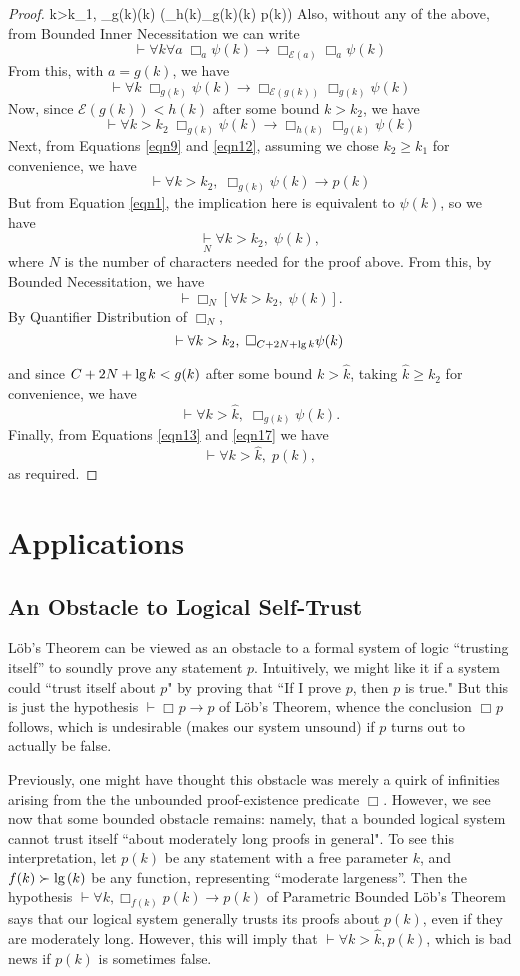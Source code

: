\documentclass[onecolumn]{miri-tech-article}
\numberwithin{equation}{section}
\newcommand{\eqn}[1]{\begin{equation}#1\end{equation}}
\theoremstyle{definition}
\newcommand{\Ee}{\mathcal{E}}
\newcommand{\proves}[1]{\underset{#1}{\vdash}}
\newcommand{\bx}[1]{\Box_{#1}}
\renewcommand{\implies}{\rightarrow}
\renewcommand{\lg}{\mathrm{lg\hspace{0.3ex}}}
\renewcommand{\-}{^{-1}}
\begin{document}
\begin{proof}
{\proves{} \forall k>k_1, \; \bx{g(k)}\psi(k) \implies \left(\bx{h(k)}\bx{g(k)}\psi(k) \implies p(k)\right)
}
Also, without any of the above, from Bounded Inner Necessitation we can write
$$\proves{} \forall k \forall a \; \bx{a}\psi(k)\implies \bx{\Ee(a)}\bx{a}\psi(k)$$
From this, with $a=g(k)$, we have
$$\proves{} \forall k \; \bx{g(k)}\psi(k)\implies \bx{\Ee(g(k))}\bx{g(k)}\psi(k)$$
Now, since $\Ee(g(k)) < h(k)$ after some bound $k>k_2$, we have
\eqn{\label{eqn12}
\proves{} \forall k > k_2 \; \bx{g(k)}\psi(k)\implies \bx{h(k)}\bx{g(k)}\psi(k)
}
Next, from Equations \ref{eqn9} and \ref{eqn12}, assuming we chose $k_2\geq k_1$ for convenience, we have
\eqn{\label{eqn13}
\proves{} \forall k>k_2,\; \bx{g(k)}\psi(k)\implies p(k)
}
But from Equation \ref{eqn1}, the implication here is equivalent to $\psi(k)$, so we have
$$ \proves{N} \forall k>k_2,\; \psi(k),$$
where $N$ is the number of characters needed for the proof above.  From this, by Bounded Necessitation, we have
$$\proves{} \bx{N} [\forall k>k_2,\; \psi(k)].$$
By Quantifier Distribution of $\bx{N}$,
$$\proves{} \forall k>k_2,\; \bx{C + 2N + \lg k} \psi(k)$$
and since $C + 2N + \lg k < g(k)$ after some bound $k>\hat k$, taking $\hat k \geq k_2$ for convenience, we have
\eqn{\label{eqn17}
\proves{}\forall k>\hat k,\; \bx{g(k)}\psi(k).
}
Finally, from Equations \ref{eqn13} and \ref{eqn17} we have
$$\proves{} \forall k>\hat k,\; p(k),$$
as required.
\end{proof}


\section{Applications}
\subsection{An Obstacle to Logical Self-Trust}
\label{sec:selftrust}
L\"{o}b's Theorem can be viewed as an obstacle to a formal system of logic ``trusting itself'' to soundly prove any statement $p$.  Intuitively, we might like it if a system could ``trust itself about $p$" by proving that ``If I prove $p$, then $p$ is true."  But this is just the hypothesis $\proves{} \bx{}p \implies p$ of L\"{o}b's Theorem, whence the conclusion $\bx{}p$ follows, which is undesirable (makes our system unsound) if $p$ turns out to actually be false.

Previously, one might have thought this obstacle was merely a quirk of infinities arising from the the unbounded proof-existence predicate $\bx{}$.  However, we see now that some bounded obstacle remains: namely, that a bounded logical system cannot trust itself ``about moderately long proofs in general".  To see this interpretation, let $p(k)$ be any statement with a free parameter $k$, and $f(k) \succ \lg(k)$ be any function, representing ``moderate largeness''.  Then the hypothesis $\proves{} \forall k, \bx{f(k)} p(k) \implies p(k)$ of Parametric Bounded L\"{o}b's Theorem says that our logical system generally trusts its proofs about $p(k)$, even if they are moderately long.  However, this will imply that $\proves{} \forall k > \hat k, p(k)$, which is bad news if $p(k)$ is sometimes false.
\end{document}
